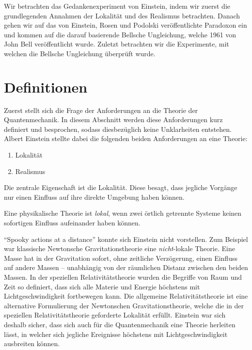\begin{refsection}
Wir betrachten das Gedankenexperiment von Einstein, indem wir zuerst die
grundlegenden Annahmen der Lokalit\"at und des Realismus betrachten. Danach
gehen wir auf das von Einstein, Rosen und Podolski ver\"offentlichte Paradoxon
ein und kommen auf die darauf basierende Bellsche Ungleichung, welche
1961 von John Bell ver\"offentlicht wurde.
Zuletzt betrachten wir die Experimente, mit welchen die Bellsche Ungleichung
\"uberpr\"uft wurde.

\section{Definitionen\label{section:bell:definitionen}}
Zuerst stellt sich die Frage der Anforderungen an die Theorie der
Quantenmechanik.
In diesem Abschnitt werden diese Anforderungen kurz definiert und
besprochen, sodass diesbez\"uglich keine Unklarheiten entstehen.
Albert Einstein stellte dabei die folgenden beiden Anforderungen an eine
Theorie:

\begin{enumerate}
    \item Lokalit\"at
    \item Realismus
\end{enumerate}

Die zentrale Eigenschaft ist die Lokalit\"at.
Diese besagt, dass jegliche Vorg\"ange nur einen Einfluss
auf ihre direkte Umgebung haben k\"onnen.

\begin{definition}\label{def:bell:lokalitaet}
    Eine physikalische Theorie ist \emph{lokal}, wenn zwei \"ortlich getrennte
    Systeme keinen sofortigen Einfluss aufeinander haben k\"onnen.
\end{definition}

\foreignquote{english}{Spooky actions at a distance} \cite[S.~158]{Bell:BornEinstein1971}
konnte sich Einstein nicht vorstellen.
Zum Beispiel war klassische Newtonsche Gravitationstheorie
eine \emph{nicht}-lokale Theorie. 
Eine Masse hat in der Gravitation sofort, ohne zeitliche 
Verz\"ogerung, einen Einfluss auf andere Massen -- unabh\"angig von der
r\"aumlichen Distanz zwischen den beiden Massen. 
In der speziellen Relativit\"atstheorie wurden die Begriffe von Raum und Zeit
so definiert, dass sich alle Materie und Energie h\"ochstens mit
Lichtgeschwindigkeit fortbewegen kann. 
Die allgemeine Relativit\"atstheorie ist eine alternative Formulierung
der Newtonschen Gravitationstheorie, welche die in der speziellen
Relativit\"atstheorie geforderte Lokalit\"at erf\"ullt.
Einstein war sich deshalb sicher, dass sich auch f\"ur die Quantenmechanik eine
Theorie herleiten l\"asst, in welcher sich jegliche Ereignisse h\"ochstens mit
Lichtgeschwindigkeit ausbreiten k\"onnen.


\end{refsection}
